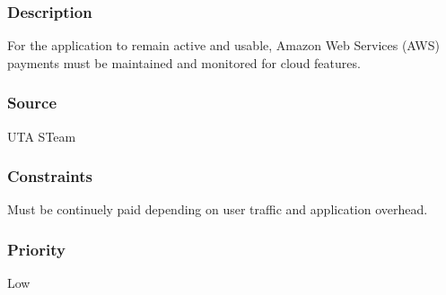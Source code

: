 \subsubsection{Description}
For the application to remain active and usable, Amazon Web Services (AWS) payments must be maintained and monitored for cloud features.
\subsubsection{Source}
UTA STeam
\subsubsection{Constraints}
Must be continuely paid depending on user traffic and application overhead.
\subsubsection{Priority}
Low
